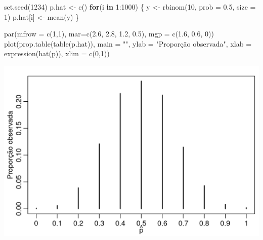 \documentclass[
  10pt,
  a4paper]{book}
\newenvironment{Shaded}{\begin{snugshade}}{\end{snugshade}}
\newcommand{\AttributeTok}[1]{\textcolor[rgb]{0.77,0.63,0.00}{#1}}
\newcommand{\ControlFlowTok}[1]{\textcolor[rgb]{0.13,0.29,0.53}{\textbf{#1}}}
\newcommand{\DecValTok}[1]{\textcolor[rgb]{0.00,0.00,0.81}{#1}}
\newcommand{\FloatTok}[1]{\textcolor[rgb]{0.00,0.00,0.81}{#1}}
\newcommand{\FunctionTok}[1]{\textcolor[rgb]{0.00,0.00,0.00}{#1}}
\newcommand{\NormalTok}[1]{#1}
\newcommand{\OtherTok}[1]{\textcolor[rgb]{0.56,0.35,0.01}{#1}}
\newcommand{\SpecialCharTok}[1]{\textcolor[rgb]{0.00,0.00,0.00}{#1}}
\newcommand{\StringTok}[1]{\textcolor[rgb]{0.31,0.60,0.02}{#1}}
\begin{document}
\begin{Shaded}
\begin{Highlighting}[]
\FunctionTok{set.seed}\NormalTok{(}\DecValTok{1234}\NormalTok{)}
\NormalTok{p.hat }\OtherTok{\textless{}{-}} \FunctionTok{c}\NormalTok{()}
\ControlFlowTok{for}\NormalTok{(i }\ControlFlowTok{in} \DecValTok{1}\SpecialCharTok{:}\DecValTok{1000}\NormalTok{) \{}
\NormalTok{  y }\OtherTok{\textless{}{-}} \FunctionTok{rbinom}\NormalTok{(}\DecValTok{10}\NormalTok{, }\AttributeTok{prob =} \FloatTok{0.5}\NormalTok{, }\AttributeTok{size =} \DecValTok{1}\NormalTok{)}
\NormalTok{  p.hat[i] }\OtherTok{\textless{}{-}} \FunctionTok{mean}\NormalTok{(y)}
\NormalTok{\}}
\end{Highlighting}
\end{Shaded}

\begin{Shaded}
\begin{Highlighting}[]
\FunctionTok{par}\NormalTok{(}\AttributeTok{mfrow =} \FunctionTok{c}\NormalTok{(}\DecValTok{1}\NormalTok{,}\DecValTok{1}\NormalTok{), }\AttributeTok{mar=}\FunctionTok{c}\NormalTok{(}\FloatTok{2.6}\NormalTok{, }\FloatTok{2.8}\NormalTok{, }\FloatTok{1.2}\NormalTok{, }\FloatTok{0.5}\NormalTok{), }\AttributeTok{mgp =} \FunctionTok{c}\NormalTok{(}\FloatTok{1.6}\NormalTok{, }\FloatTok{0.6}\NormalTok{, }\DecValTok{0}\NormalTok{))}
\FunctionTok{plot}\NormalTok{(}\FunctionTok{prop.table}\NormalTok{(}\FunctionTok{table}\NormalTok{(p.hat)), }\AttributeTok{main =} \StringTok{""}\NormalTok{, }
     \AttributeTok{ylab =} \StringTok{"Proporção observada"}\NormalTok{,}
     \AttributeTok{xlab =} \FunctionTok{expression}\NormalTok{(}\FunctionTok{hat}\NormalTok{(p)), }\AttributeTok{xlim =} \FunctionTok{c}\NormalTok{(}\DecValTok{0}\NormalTok{,}\DecValTok{1}\NormalTok{))}
\end{Highlighting}
\end{Shaded}

\begin{center}\includegraphics{figures/unnamed-chunk-380-1} \end{center}
\end{document}
